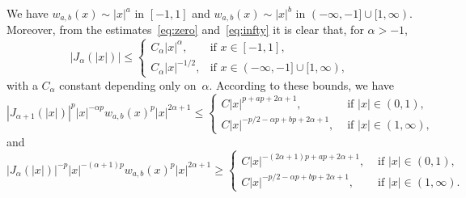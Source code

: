 \documentclass[a4paper]{amsart}
\numberwithin{equation}{section}
\theoremstyle{plain}
\theoremstyle{remark}
\begin{document}
We have $w_{a,b}(x) \sim |x|^a$ in $[-1,1]$ and $w_{a,b}(x) \sim |x|^b$ in $(-\infty,-1] \cup [1,\infty)$.
Moreover, from the estimates~\eqref{eq:zero} and~\eqref{eq:infty} it is clear that, for $\alpha>-1$,
\begin{equation*}
    |J_\alpha(|x|)| \le 
    \begin{cases} 
      C_\alpha |x|^\alpha, & \text{if $x \in [-1,1]$}, \\
      C_\alpha |x|^{-1/2}, & \text{if $x \in (-\infty,-1] \cup [1,\infty)$},
    \end{cases}
\end{equation*}
with a $C_\alpha$ constant depending only on~$\alpha$.
According to these bounds, we have 
\begin{equation*}
   |J_{\alpha+1}(|x|)|^p |x|^{-\alpha p} w_{a,b}(x)^p |x|^{2\alpha+1} 
  \le
  \begin{cases}
    C |x|^{p + ap + 2\alpha+1} , &{\text{ if }} |x| \in (0,1), \\
    C |x|^{-p/2 - \alpha p + bp + 2\alpha+1}, &{\text{ if }} |x| \in (1,\infty),
  \end{cases}
\end{equation*}
and 
\begin{equation*}
  |J_{\alpha}(|x|)|^{-p} |x|^{-(\alpha+1)p} w_{a,b}(x)^p |x|^{2\alpha+1} 
  \ge
  \begin{cases}
    C |x|^{-(2\alpha+1)p + ap + 2\alpha+1}, &{\text{ if }} |x| \in (0,1), \\
    C |x|^{-p/2 - \alpha p + bp + 2\alpha+1}, &{\text{ if }} |x| \in (1,\infty).
  \end{cases}
\end{equation*}
\end{document}
